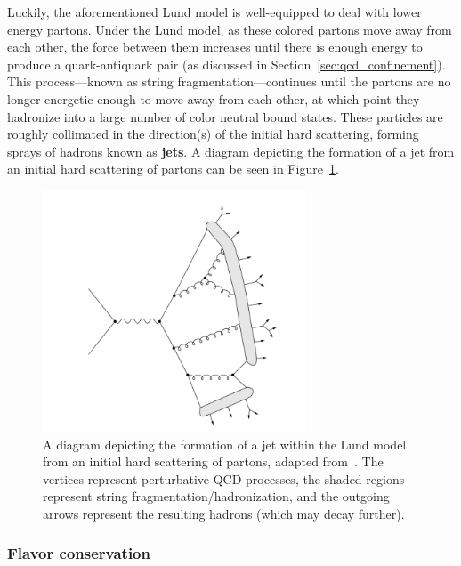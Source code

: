 Luckily, the aforementioned Lund model is well-equipped to deal with lower energy partons. Under the Lund model, as these colored partons move away from each other, the force between them increases until there is enough energy to produce a quark-antiquark pair (as discussed in Section~\ref{sec:qcd_confinement}). This process---known as string fragmentation---continues until the partons are no longer energetic enough to move away from each other, at which point they hadronize into a large number of color neutral bound states. These particles are roughly collimated in the direction(s) of the initial hard scattering, forming sprays of hadrons known as \textbf{jets}. A diagram depicting the formation of a jet from an initial hard scattering of partons can be seen in Figure~\ref{fig:jet_diagram}. 

\begin{figure}[ht]
    \centering
    \includegraphics[width=0.7\textwidth]{figures/introduction/jet_string.png}
    \caption{A diagram depicting the formation of a jet within the Lund model from an initial hard scattering of partons, adapted from~\cite{JetStringDiagram}. The vertices represent perturbative QCD processes, the shaded regions represent string fragmentation/hadronization, and the outgoing arrows represent the resulting hadrons (which may decay further).}
    \label{fig:jet_diagram}
\end{figure}

\subsubsection{Flavor conservation}
\label{sec:flavor_conservation}

